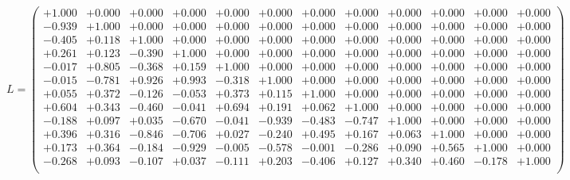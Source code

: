 \documentclass[9pt]{article}
\theoremstyle{plain}
\theoremstyle{definition}
\theoremstyle{remark}
\numberwithin{equation}{section}
\begin{document}
$L = \left(
\begin{array}{
cccccccccccc}
+1.000 & +0.000 & +0.000 & +0.000 & +0.000 & +0.000 & +0.000 & +0.000 & +0.000 & +0.000 & +0.000 & +0.000 \\
-0.939 & +1.000 & +0.000 & +0.000 & +0.000 & +0.000 & +0.000 & +0.000 & +0.000 & +0.000 & +0.000 & +0.000 \\
-0.405 & +0.118 & +1.000 & +0.000 & +0.000 & +0.000 & +0.000 & +0.000 & +0.000 & +0.000 & +0.000 & +0.000 \\
+0.261 & +0.123 & -0.390 & +1.000 & +0.000 & +0.000 & +0.000 & +0.000 & +0.000 & +0.000 & +0.000 & +0.000 \\
-0.017 & +0.805 & -0.368 & +0.159 & +1.000 & +0.000 & +0.000 & +0.000 & +0.000 & +0.000 & +0.000 & +0.000 \\
-0.015 & -0.781 & +0.926 & +0.993 & -0.318 & +1.000 & +0.000 & +0.000 & +0.000 & +0.000 & +0.000 & +0.000 \\
+0.055 & +0.372 & -0.126 & -0.053 & +0.373 & +0.115 & +1.000 & +0.000 & +0.000 & +0.000 & +0.000 & +0.000 \\
+0.604 & +0.343 & -0.460 & -0.041 & +0.694 & +0.191 & +0.062 & +1.000 & +0.000 & +0.000 & +0.000 & +0.000 \\
-0.188 & +0.097 & +0.035 & -0.670 & -0.041 & -0.939 & -0.483 & -0.747 & +1.000 & +0.000 & +0.000 & +0.000 \\
+0.396 & +0.316 & -0.846 & -0.706 & +0.027 & -0.240 & +0.495 & +0.167 & +0.063 & +1.000 & +0.000 & +0.000 \\
+0.173 & +0.364 & -0.184 & -0.929 & -0.005 & -0.578 & -0.001 & -0.286 & +0.090 & +0.565 & +1.000 & +0.000 \\
-0.268 & +0.093 & -0.107 & +0.037 & -0.111 & +0.203 & -0.406 & +0.127 & +0.340 & +0.460 & -0.178 & +1.000 \\
\end{array}
\right)$ \newline 
\end{document}
